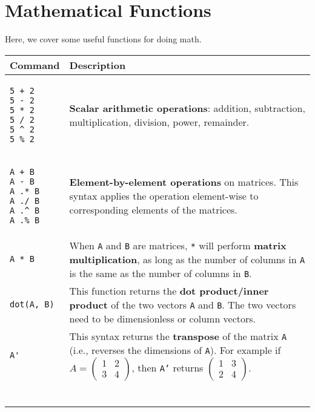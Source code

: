 \documentclass[]{article}
\begin{document}
\section{Mathematical Functions}
Here, we cover some useful functions for doing math.
\begin{longtable}{ |m{6cm}  | m{11cm} |}
	\hline
	\textbf{Command} & \textbf{Description}
	\\\hline
	\begin{verbatim}
5 + 2
5 - 2
5 * 2 
5 / 2
5 ^ 2
5 % 2
	\end{verbatim}
	& \textbf{Scalar arithmetic operations}: addition, subtraction, multiplication, division, power, remainder.
	\\\hline
	\begin{verbatim}
A + B
A - B
A .* B
A ./ B
A .^ B
A .% B
	\end{verbatim}
    & \textbf{Element-by-element operations} on matrices. This syntax applies
    the operation element-wise to corresponding elements of the matrices.
    \\\hline
	\begin{verbatim}
A * B
	\end{verbatim}
	& When \texttt{A} and \texttt{B} are matrices, \texttt{*} will perform
    \textbf{matrix multiplication}, as long as the number of columns in \texttt{A} is the same as the number of columns in \texttt{B}. 
	\\\hline
	\begin{verbatim}
dot(A, B)
	\end{verbatim}
	& This function returns the \textbf{dot product/inner product} of the two vectors
    \texttt{A} and \texttt{B}. The two vectors need to be dimensionless or
    column vectors.	\\\hline
    \begin{verbatim}
A'
	\end{verbatim}
	& This syntax returns the \textbf{transpose} of the matrix
    \texttt{A} (i.e., reverses the dimensions of \texttt{A}). For example if
    $A = \begin{pmatrix}
    1 & 2 \\
    3 & 4 
    \end{pmatrix}$, then \texttt{A'} returns 
    $\begin{pmatrix}
    1 & 3 \\
    2 & 4
    \end{pmatrix}$. \\\hline
\begin{verbatim}

\end{verbatim}
\end{longtable}
\end{document}
